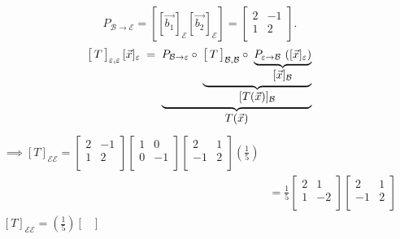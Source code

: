 \documentclass{report}
\begin{document}
{
\\
\\
            \[
            P _{ \mathcal{B} \to \mathcal{E}} = \left[ \left[ \vec{ b_1}  \right] _{ \mathcal{E}} \left[ \vec{ b_2}  \right] _{ \mathcal{E}}  \right] = \begin{bmatrix}
            2 & -1\\
            1 & 2\\
            \end{bmatrix}
            .\] 
            \[
\bigl[\,T\,\bigr]_{\varepsilon,\varepsilon}\,[\vec{x}]_{\varepsilon}
\;=\;
\underbrace{%
    P_{\mathcal B\to\varepsilon} \circ\;
  \underbrace{%
    \bigl[\,T\,\bigr]_{\mathcal B,\mathcal B} \circ\;
    \underbrace{%
      P_{\varepsilon\to\mathcal B}\, \left(   [\vec{x}]_{\varepsilon} \right)
    }_{\displaystyle[\vec{x}]_{\mathcal B}}
  }_{\displaystyle[T(\vec{x})]_{\mathcal B}}
}_{\displaystyle T(\vec{x})}
\]
\begin{align*}
  \implies \left[ T \right] _{ \mathcal{E} \mathcal{E}} = \begin{bmatrix}
  2 & -1\\
  1 & 2\\
  \end{bmatrix} \begin{bmatrix}
  1 & 0\\
  0 & -1\\
  \end{bmatrix} \begin{bmatrix}
  2 & 1\\
  -1 & 2\\
  \end{bmatrix} \left(  \frac{1}{5} \right)          \\
  & =  \frac{1}{5} \begin{bmatrix}
  2 & 1\\
  1 & -2\\
  \end{bmatrix} \begin{bmatrix}
  2 & 1\\
  -1 & 2\\
  \end{bmatrix}\\
  \left[ T \right]_{ \mathcal{E} \mathcal{E}} = \left( \frac{1}{5} \right) \begin{bmatrix}

\end{bmatrix}
\end{align*}}
\end{document}
